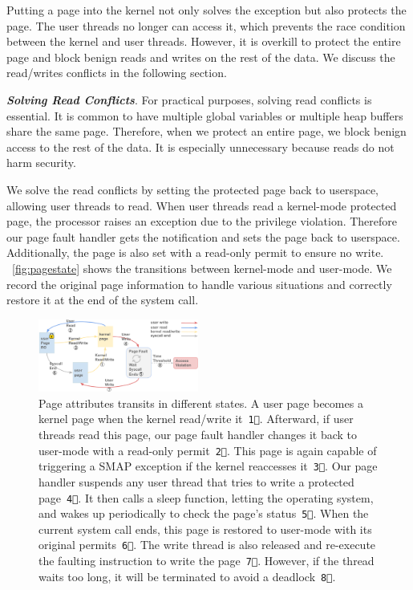 Putting a page into the kernel not only solves the exception but also protects the page. The user threads no longer can access it, which prevents the race condition between the kernel and user threads. However, it is overkill to protect the entire page and block benign reads and writes on the rest of the data. We discuss the read/writes conflicts in the following section.



\textbf{\textit{Solving Read Conflicts}}. For practical purposes, solving
read conflicts is essential. It is common to have multiple global
variables or multiple heap buffers share the same page. Therefore, when we protect an entire page, we block benign access to the rest of the data. It is especially unnecessary because reads do not harm security.

We solve the read conflicts by setting the protected page
back to userspace, allowing user threads to read. When user threads read a kernel-mode protected page, the processor raises an exception due to the privilege violation. Therefore our page fault handler gets the notification and sets the page back to userspace. Additionally, the page is also set with a read-only permit to ensure no write. ~\autoref{fig:pagestate} shows the transitions between kernel-mode and user-mode.  We record the original page information to handle various situations and correctly restore it at the end of the system call.


\begin{figure}[th]
  \includegraphics[width=0.47\textwidth]{figures/pagestate6}
  \centering
  \caption{Page attributes transits in different states. A user page becomes a kernel page when the kernel read/write it~\texttt{\textcircled{1}}. Afterward, if user threads read this page, our page fault handler changes it back to user-mode with a read-only permit~\texttt{\textcircled{2}}. This page is again capable of triggering a SMAP exception if the kernel reaccesses it~\texttt{\textcircled{3}}. Our page handler suspends any user thread that tries to write a protected page~\texttt{\textcircled{4}}. It then calls a sleep function, letting the operating system, and wakes up periodically to check the page's status~\texttt{\textcircled{5}}. When the current system call ends, this page is restored to user-mode with its original permits~\texttt{\textcircled{6}}. The write thread is also released and re-execute the faulting instruction to write the page~\texttt{\textcircled{7}}. However, if the thread waits too long, it will be terminated to avoid a deadlock~\texttt{\textcircled{8}}.}
  \label{fig:pagestate}
\end{figure}




